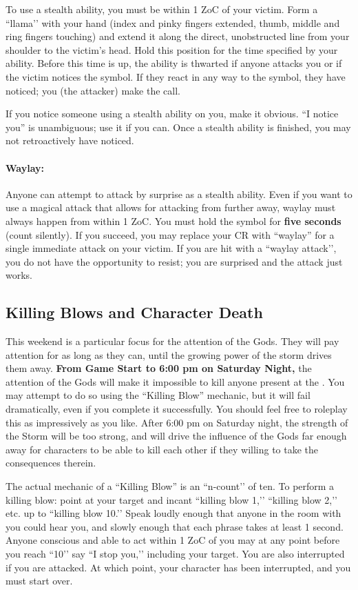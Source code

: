 \documentclass[sheet]{GL2020}
\begin{document}
To use a stealth ability, you must be within 1 ZoC of your victim. Form a ``llama’’ with your hand (index and pinky fingers extended, thumb, middle and ring fingers touching) and extend it along the direct, unobstructed line from your shoulder to the victim's head. Hold this position for the time specified by your ability. Before this time is up, the ability is thwarted if anyone attacks you or if the victim notices the symbol. If they react in any way to the symbol, they have noticed; you (the attacker) make the call.

If you notice someone using a stealth ability on you, make it obvious. ``I notice you'' is unambiguous; use it if you can. Once a stealth ability is finished, you may not retroactively have noticed.

\paragraph{Waylay:} Anyone can attempt to attack by surprise as a stealth ability. Even if you want to use a magical attack that allows for attacking from further away, waylay must always happen from within 1 ZoC. You must hold the symbol for \textbf{five seconds} (count silently). If you succeed, you may replace your CR with ``waylay'' for a single immediate attack on your victim. If you are hit with a ``waylay attack’’, you do not have the opportunity to resist; you are surprised and the attack just works.

\subsection{Killing Blows and Character Death}

This weekend is a particular focus for the attention of the Gods. They will pay attention for as long as they can, until the growing power of the storm drives them away. \textbf{From Game Start to 6:00 pm on Saturday Night,} the attention of the Gods will make it impossible to kill anyone present at the \pSc{}. You may attempt to do so using the ``Killing Blow'' mechanic, but it will fail dramatically, even if you complete it successfully. You should feel free to roleplay this as impressively as you like. After 6:00 pm on Saturday night, the strength of the Storm will be too strong, and will drive the influence of the Gods far enough away for characters to be able to kill each other if they willing to take the consequences therein.

The actual mechanic of a ``Killing Blow'' is an ``n-count’’ of ten. To perform a killing blow: point at your target and incant ``killing blow 1,’’ ``killing blow 2,’’ etc. up to ``killing blow 10.’’ Speak loudly enough that anyone in the room with you could hear you, and slowly enough that each phrase takes at least 1 second. Anyone conscious and able to act within 1 ZoC of you may at any point before you reach ``10’’ say ``I stop you,’’ including your target. You are also interrupted if you are attacked. At which point, your character has been interrupted, and you must start over.
\end{document}
